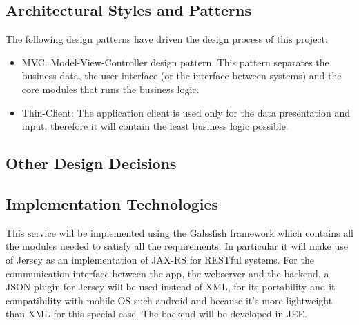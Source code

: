 \documentclass[11pt, a4paper,titlepage]{article}
\begin{document}
\subsection{Architectural Styles and Patterns}
	The following design patterns have driven the design process of this project:
	\begin{itemize}
		\item MVC: Model-View-Controller design pattern. This pattern separates the business data, the user interface (or the interface between systems) and the core modules that runs the business logic. 
		\item Thin-Client: The application client is used only for the data presentation and input, therefore it will contain the least business logic possible.
	\end{itemize}
\subsection{Other Design Decisions}
\subsection{Implementation Technologies}
	This service will be implemented using the Galssfish framework which contains all the modules needed to satisfy all the requirements. In particular it will make use of Jersey as an implementation of JAX-RS for RESTful systems. For the communication interface between the app, the webserver and the backend, a JSON plugin for Jersey will be used instead of XML, for its portability and it compatibility with mobile OS such android and because it's more lightweight than XML for this special case. The backend will be developed in JEE.
\end{document}

